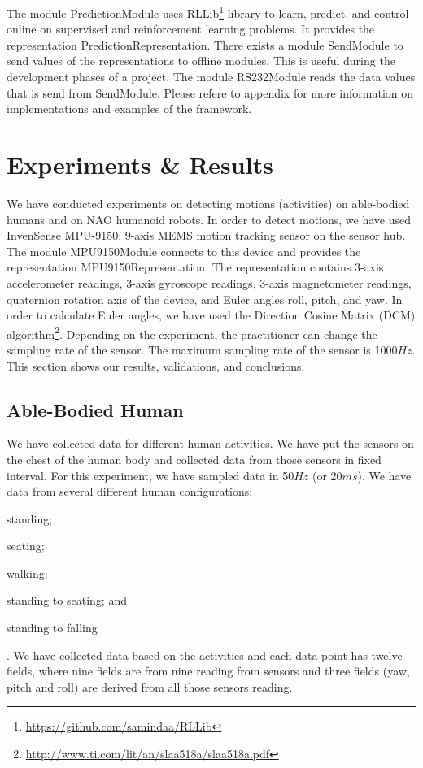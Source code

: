 \documentclass{llncs}
\begin{document}
\begin{sloppy}
The module {\sf PredictionModule} uses {\sf
RLLib}\footnote{\url{https://github.com/samindaa/RLLib}} library to learn, predict, and control
online on supervised and reinforcement learning problems. It provides
the representation {\sf PredictionRepresentation}. There exists a module {\sf SendModule} to send
values of the representations to offline modules. This is useful during the development phases of
a project. The module {\sf RS232Module} reads the data values that is send from {\sf SendModule}.
Please refere  to appendix for more information on implementations and
examples of the framework.

\section{Experiments \& Results}

We have conducted experiments on detecting motions (activities) on able-bodied humans and on NAO
humanoid robots. In order to detect motions, we have used InvenSense MPU-9150: 9-axis MEMS
motion tracking sensor on the sensor hub. The module {\sf MPU9150Module} connects to this device
and provides the representation {\sf MPU9150Representation}. The representation contains
3-axis accelerometer readings, 3-axis gyroscope readings, 3-axis magnetometer readings, quaternion
rotation axis of the device, and Euler angles roll, pitch, and yaw.  In order to calculate Euler
angles, we have used the Direction Cosine Matrix (DCM)
algorithm\footnote{\url{http://www.ti.com/lit/an/slaa518a/slaa518a.pdf}}.  Depending on the
experiment, the practitioner can change the sampling rate of the sensor.  The maximum sampling rate
of the sensor is 1000$Hz$. This section shows our results, validations, and conclusions.

\subsection{Able-Bodied Human}

We have collected data for different human activities. We have put the sensors on the chest of the
human body and collected data from those sensors in fixed interval. For this experiment, we have
sampled data in 50$Hz$ (or 20$ms$). We have data from several different human configurations:
\begin{inparaenum}[(1)] \item standing; \item seating; \item walking; \item standing to seating;
and \item standing to falling\end{inparaenum}. We have collected data based on the activities and
each data point has twelve fields, where nine fields are from nine reading from sensors and three
fields (yaw, pitch and roll) are derived from all those sensors reading.


\end{sloppy}
\end{document}
